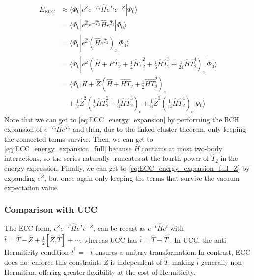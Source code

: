 \begin{align}
    E_{\text{ECC}} &\approx \langle\Phi_0| e^{\hat{Z}} e^{-\hat{T}_2} \hat{H} e^{\hat{T}_2} e^{-\hat{Z}} |\Phi_0\rangle \\
&= \langle\Phi_0| e^{\hat{Z}} e^{-\hat{T}_2} \hat{H} e^{\hat{T}_2}  |\Phi_0\rangle \\
    & = \langle\Phi_0| e^{\hat{Z}} \left(\hat{H} e^{\hat{T}_2}\right)_{\text{c}} |\Phi_0\rangle \label{eq:ECC_energy_expansion}
    \\
    & = \langle\Phi_0| e^{\hat{Z}} \left(\hat{H} + \hat{H} \hat{T}_2 + \frac{1}{2} \hat{H} \hat{T}_2^2 + \frac{1}{6} \hat{H} \hat{T}_2^3 + \frac{1}{24} \hat{H} \hat{T}_2^4 \right)_{\text{c}} |\Phi_0\rangle \label{eq:ECC_energy_expansion_full}
    \\
    & = \langle\Phi_0| \hat{H} 
    + \hat{Z} \left(\hat{H} + \hat{H} \hat{T}_2 + \frac{1}{2} \hat{H} \hat{T}_2^2 \right)_{\text{c}} \label{eq:ECC_energy_expansion_full_Z}
    \\
    & \quad + \frac{1}{2} \hat{Z}^2 \left(\frac{1}{2} \hat{H} \hat{T}_2^2 + \frac{1}{6} \hat{H} \hat{T}_2^3\right)_{\text{c}}
    + \frac{1}{6} \hat{Z}^3 \left(\frac{1}{24} \hat{H} \hat{T}_2^4 \right)_{\text{c}}
     |\Phi_0\rangle \nonumber
\end{align}
Note that we can get to \ref{eq:ECC_energy_expansion} by performing the BCH expansion of $e^{-\hat{T}_2} \hat{H} e^{\hat{T}_2}$ and then, due to the linked cluster theorem, only keeping the connected terms survive. Then, we can get to \ref{eq:ECC_energy_expansion_full} because $\hat{H}$ contains at most two-body interactions, so the series naturally truncates at the fourth power of $\hat{T}_2$ in the energy expression. Finally, we can get to \ref{eq:ECC_energy_expansion_full_Z} by expanding $e^{\hat{Z}}$, but once again only keeping the terms that survive the vacuum expectation value.
\subsubsection{Comparison with UCC}
The ECC form, $e^{\hat{Z}} e^{-\hat{T}} \hat{H} e^{\hat{T}} e^{-\hat{Z}}$, can be recast as $e^{-\hat{t}} \hat{H} e^{\hat{t}}$ with $\hat{t} = \hat{T} - \hat{Z} + \frac{1}{2}\left[\hat{Z},\hat{T}\right] + \cdots$, whereas UCC has $\hat{t} = \hat{T} - \hat{T}^\dag$.
In UCC, the anti-Hermiticity condition $\hat{t}^\dag = -\hat{t}$ ensures a unitary transformation.
In contrast, ECC does not enforce this constraint: $\hat{Z}$ is independent of $\hat{T}$, making $\hat{t}$ generally non-Hermitian, offering greater flexibility at the cost of Hermiticity.

